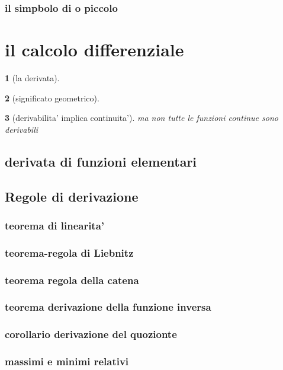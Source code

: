 \documentclass{article}
\theoremstyle{mystyle}
\newtheorem*{mydefinition}{}
\begin{document}
\subsubsection{il simpbolo di o piccolo}

\section{il calcolo differenziale}
\begin{mydefinition}[la derivata]
    
\end{mydefinition}
\begin{mydefinition}[significato geometrico]
    
\end{mydefinition}
\begin{mydefinition}[derivabilita' implica continuita']
    ma non tutte le funzioni continue sono derivabili
\end{mydefinition}
\subsection{derivata di funzioni elementari}
\subsection{Regole di derivazione }
\subsubsection{teorema di linearita'}
\subsubsection{teorema-regola di Liebnitz}
\subsubsection{teorema regola della catena}
\subsubsection{teorema derivazione della funzione inversa}
\subsubsection{corollario derivazione del quozionte}
\subsubsection{massimi e minimi relativi}
\end{document}
